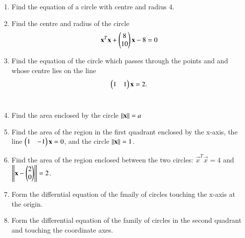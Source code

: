 \renewcommand{\theequation}{\theenumi}
\begin{enumerate}[label=\arabic*.,ref=\thesubsection.\theenumi]
\item Find the equation of a circle with centre  and radius 4.
\\
\solution 


\item Find the centre and radius of the circle
\begin{align}
\mathbf{x}^T\mathbf{x}+\begin{pmatrix}8\\10\end{pmatrix}\mathbf{x} -8= 0
\end{align}
%
\item Find the equation of the circle which passes through the points  and  and whose centre lies on the line 
\begin{align}
\label{eq:4.1.3_line}
\begin{pmatrix}1 & 1\end{pmatrix} \mathbf{x} = 2.
\end{align}
\\
\solution 

\item Find the area enclosed by the circle $\left\lVert\mathbf{x}\right\rVert = a$
%
\item Find the area of the region in the first quadrant enclosed by the x-axis, the line $\begin{pmatrix}1 & -1\end{pmatrix}\mathbf{x} = 0$, and the circle $\left\lVert\mathbf{x}\right\rVert = 1$.
%
\item Find the area of the region enclosed between the two circles: $\vec{x}^T\vec{x} = 4$ and $\left\lVert\mathbf{x}-\begin{pmatrix}2\\0\end{pmatrix}\right\rVert = 2$.
%
\item Form the differntial equation of the fmaily of circles touching the x-axis at the origin.
%
\item Form the differential equation of the family of circles in the second quadrant and touching the coordinate axes.
\end{enumerate}
